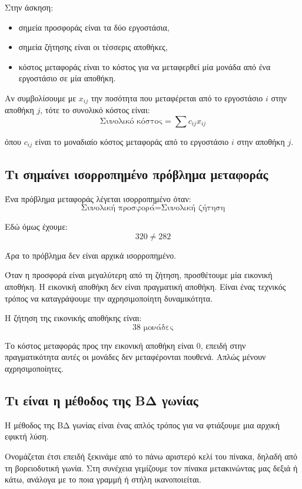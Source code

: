\documentclass[12pt,a4paper]{article}
\begin{document}
Στην άσκηση:

\begin{itemize}
    \item σημεία προσφοράς είναι τα δύο εργοστάσια,
    \item σημεία ζήτησης είναι οι τέσσερις αποθήκες,
    \item κόστος μεταφοράς είναι το κόστος για να μεταφερθεί μία μονάδα από ένα εργοστάσιο σε μία αποθήκη.
\end{itemize}

Αν συμβολίσουμε με \(x_{ij}\) την ποσότητα που μεταφέρεται από το εργοστάσιο \(i\) στην αποθήκη \(j\), τότε το συνολικό κόστος είναι:
\[
\text{Συνολικό κόστος}=\sum c_{ij}x_{ij}
\]

όπου \(c_{ij}\) είναι το μοναδιαίο κόστος μεταφοράς από το εργοστάσιο \(i\) στην αποθήκη \(j\).

\subsection{Τι σημαίνει ισορροπημένο πρόβλημα μεταφοράς}

Ένα πρόβλημα μεταφοράς λέγεται ισορροπημένο όταν:
\[
\text{Συνολική προσφορά}=\text{Συνολική ζήτηση}
\]

Εδώ όμως έχουμε:
\[
320 \neq 282
\]

Άρα το πρόβλημα δεν είναι αρχικά ισορροπημένο.

Όταν η προσφορά είναι μεγαλύτερη από τη ζήτηση, προσθέτουμε μία εικονική αποθήκη. Η εικονική αποθήκη δεν είναι πραγματική αποθήκη. Είναι ένας τεχνικός τρόπος να καταγράψουμε την αχρησιμοποίητη δυναμικότητα.

Η ζήτηση της εικονικής αποθήκης είναι:
\[
38 \text{ μονάδες}
\]

Το κόστος μεταφοράς προς την εικονική αποθήκη είναι 0, επειδή στην πραγματικότητα αυτές οι μονάδες δεν μεταφέρονται πουθενά. Απλώς μένουν αχρησιμοποίητες.

\subsection{Τι είναι η μέθοδος της ΒΔ γωνίας}

Η μέθοδος της ΒΔ γωνίας είναι ένας απλός τρόπος για να φτιάξουμε μια αρχική εφικτή λύση.

Ονομάζεται έτσι επειδή ξεκινάμε από το πάνω αριστερό κελί του πίνακα, δηλαδή από τη βορειοδυτική γωνία. Στη συνέχεια γεμίζουμε τον πίνακα μετακινώντας μας δεξιά ή κάτω, ανάλογα με το ποια γραμμή ή στήλη ικανοποιείται.
\end{document}
